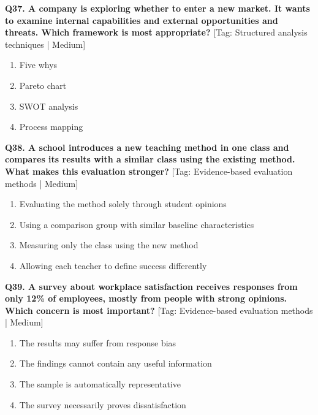 \noindent\textbf{Q37. A company is exploring whether to enter a new market. It wants to examine internal capabilities and external opportunities and threats. Which framework is most appropriate?} \hfill [Tag: Structured analysis techniques | Medium]
\begin{enumerate}[label=(\alph*),topsep=2pt,itemsep=1pt,partopsep=0pt,parsep=0pt]
    \item {Five whys}
    \item {Pareto chart}
    \item {SWOT analysis}
    \item {Process mapping}
\end{enumerate}
\vspace{2mm}

\noindent\textbf{Q38. A school introduces a new teaching method in one class and compares its results with a similar class using the existing method. What makes this evaluation stronger?} \hfill [Tag: Evidence-based evaluation methods | Medium]
\begin{enumerate}[label=(\alph*),topsep=2pt,itemsep=1pt,partopsep=0pt,parsep=0pt]
    \item {Evaluating the method solely through student opinions}
    \item {Using a comparison group with similar baseline characteristics}
    \item {Measuring only the class using the new method}
    \item {Allowing each teacher to define success differently}
\end{enumerate}
\vspace{2mm}

\noindent\textbf{Q39. A survey about workplace satisfaction receives responses from only 12\% of employees, mostly from people with strong opinions. Which concern is most important?} \hfill [Tag: Evidence-based evaluation methods | Medium]
\begin{enumerate}[label=(\alph*),topsep=2pt,itemsep=1pt,partopsep=0pt,parsep=0pt]
    \item {The results may suffer from response bias}
    \item {The findings cannot contain any useful information}
    \item {The sample is automatically representative}
    \item {The survey necessarily proves dissatisfaction}
\end{enumerate}
\vspace{2mm}

